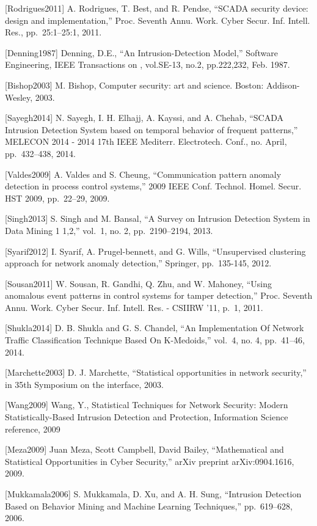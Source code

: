 \documentclass[12pt,]{article}
\begin{document}
{[}Rodrigues2011{]} A. Rodrigues, T. Best, and R. Pendse, ``SCADA
security device: design and implementation,'' Proc. Seventh Annu. Work.
Cyber Secur. Inf. Intell. Res., pp.~25:1--25:1, 2011.

{[}Denning1987{]} Denning, D.E., ``An Intrusion-Detection Model,''
Software Engineering, IEEE Transactions on , vol.SE-13, no.2,
pp.222,232, Feb. 1987.

{[}Bishop2003{]} M. Bishop, Computer security: art and science. Boston:
Addison-Wesley, 2003.

{[}Sayegh2014{]} N. Sayegh, I. H. Elhajj, A. Kayssi, and A. Chehab,
``SCADA Intrusion Detection System based on temporal behavior of
frequent patterns,'' MELECON 2014 - 2014 17th IEEE Mediterr.
Electrotech. Conf., no. April, pp.~432--438, 2014.

{[}Valdes2009{]} A. Valdes and S. Cheung, ``Communication pattern
anomaly detection in process control systems,'' 2009 IEEE Conf. Technol.
Homel. Secur. HST 2009, pp.~22--29, 2009.

{[}Singh2013{]} S. Singh and M. Bansal, ``A Survey on Intrusion
Detection System in Data Mining 1 1,2,'' vol.~1, no. 2, pp.~2190--2194,
2013.

{[}Syarif2012{]} I. Syarif, A. Prugel-bennett, and G. Wills,
``Unsupervised clustering approach for network anomaly detection,''
Springer, pp.~135-145, 2012.

{[}Sousan2011{]} W. Sousan, R. Gandhi, Q. Zhu, and W. Mahoney, ``Using
anomalous event patterns in control systems for tamper detection,''
Proc. Seventh Annu. Work. Cyber Secur. Inf. Intell. Res. - CSIIRW '11,
p.~1, 2011.

{[}Shukla2014{]} D. B. Shukla and G. S. Chandel, ``An Implementation Of
Network Traffic Classification Technique Based On K-Medoids,'' vol.~4,
no. 4, pp.~41--46, 2014.

{[}Marchette2003{]} D. J. Marchette, ``Statistical opportunities in
network security,'' in 35th Symposium on the interface, 2003.

{[}Wang2009{]} Wang, Y., Statistical Techniques for Network Security:
Modern Statistically-Based Intrusion Detection and Protection,
Information Science reference, 2009

{[}Meza2009{]} Juan Meza, Scott Campbell, David Bailey, ``Mathematical
and Statistical Opportunities in Cyber Security,'' arXiv preprint
arXiv:0904.1616, 2009.

{[}Mukkamala2006{]} S. Mukkamala, D. Xu, and A. H. Sung, ``Intrusion
Detection Based on Behavior Mining and Machine Learning Techniques,''
pp.~619--628, 2006.
\end{document}
